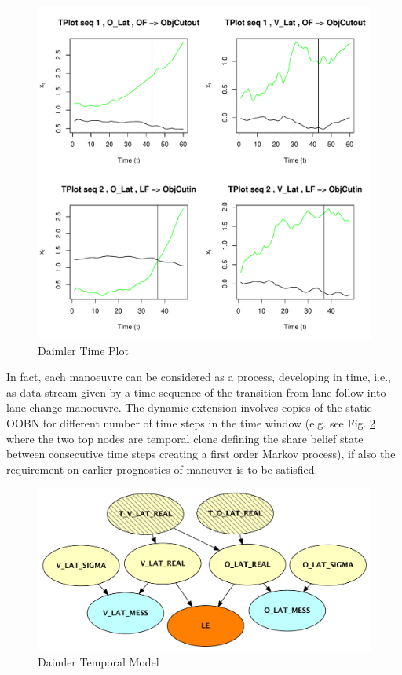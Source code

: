 \begin{figure}[tb]
\begin{center}
\includegraphics[scale=0.65]{./figures/DaimlerLE_EGO_L_LE_OBJ_L_OBJCut.pdf}
\caption{\label{Figure:daimlerTPlot}Daimler Time Plot}
\end{center}
\end{figure}

In fact, each manoeuvre can be considered as a process, developing in time, i.e., as data stream given by a time sequence of the transition from lane follow into lane change manoeuvre. The dynamic extension involves copies of the static OOBN for different number of time steps in the time window (e.g. see Fig. \ref{Figure:daimlerLEdyn} where the two top nodes are temporal clone defining the share belief state between consecutive time steps creating a first order Markov process), if also the requirement on earlier prognostics of maneuver is to be satisfied. 

\begin{figure}
\begin{center}
\includegraphics[scale=0.5]{./figures/DaimlerLEdyn.pdf}
\end{center}
\caption{\label{Figure:daimlerLEdyn}Daimler Temporal Model}
\end{figure}



